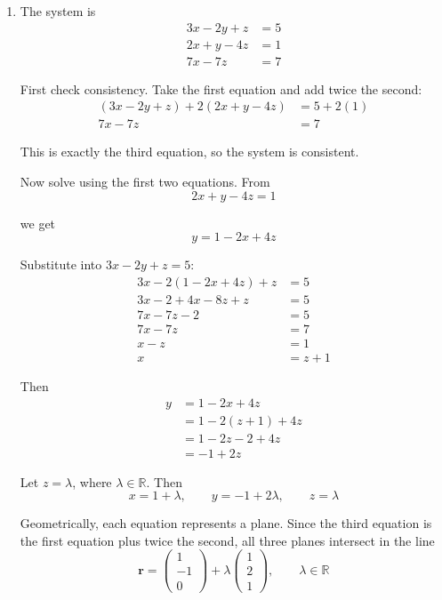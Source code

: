 \documentclass[leqno]{article}
\begin{document}
\begin{enumerate}[
  label=\textbf{\arabic*.},
  leftmargin=*,
  topsep=0pt,
  partopsep=0pt,
  parsep=0pt
]
\begin{djsSolution}
\begin{enumerate}[label=\textbf{(\alph*)}]
Therefore \(\mathbf{A}\) is singular.

Since a unique solution to \(\mathbf{A}\mathbf{x}=\mathbf{b}\) would require \(\mathbf{A}\) to be non-singular, the system does not have a unique solution.

\item The system is
\begin{align*}
3x-2y+z&=5 \\
2x+y-4z&=1 \\
7x-7z&=7
\end{align*}

First check consistency. Take the first equation and add twice the second:
\begin{align*}
(3x-2y+z)+2(2x+y-4z)&=5+2(1) \\
7x-7z&=7
\end{align*}

This is exactly the third equation, so the system is consistent.

Now solve using the first two equations. From
\[
2x+y-4z=1
\]

we get
\[
y=1-2x+4z
\]

Substitute into \(3x-2y+z=5\):
\begin{align*}
3x-2(1-2x+4z)+z&=5 \\
3x-2+4x-8z+z&=5 \\
7x-7z-2&=5 \\
7x-7z&=7 \\
x-z&=1 \\
x&=z+1
\end{align*}

Then
\begin{align*}
y&=1-2x+4z \\
&=1-2(z+1)+4z \\
&=1-2z-2+4z \\
&=-1+2z
\end{align*}

Let \(z=\lambda\), where \(\lambda\in\mathbb{R}\). Then
\[
x=1+\lambda,\qquad y=-1+2\lambda,\qquad z=\lambda
\]

Geometrically, each equation represents a plane. Since the third equation is the first equation plus twice the second, all three planes intersect in the line
\[
\mathbf{r}=
\begin{pmatrix}1\\-1\\0\end{pmatrix}
+\lambda\begin{pmatrix}1\\2\\1\end{pmatrix},
\qquad \lambda\in\mathbb{R}
\]


\end{enumerate}
\end{djsSolution}
\end{enumerate}
\end{document}
